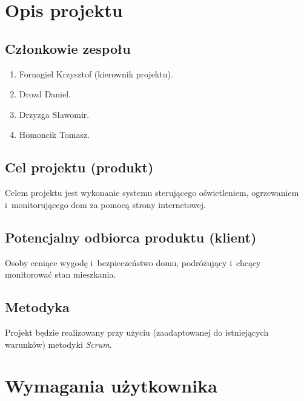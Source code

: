 	\newpage
	
	\section{Opis projektu}
	
	\subsection{Członkowie zespołu}
	
	\begin{enumerate}
		\item Fornagiel Krzysztof (kierownik projektu).
		\item Drozd Daniel.
		\item Drzyzga Sławomir.
		\item Homoncik Tomasz.
	\end{enumerate}
	
	\subsection{Cel projektu (produkt)}
	Celem projektu jest wykonanie systemu sterującego oświetleniem, ogrzewaniem i~monitorującego dom za pomocą strony internetowej.
	
	\subsection{Potencjalny odbiorca produktu (klient)}
	Osoby ceniące wygodę i~bezpieczeństwo domu, podróżujący i~chcący monitorować stan mieszkania.
	
	
	\subsection{Metodyka}
	
	Projekt będzie realizowany przy użyciu (zaadaptowanej do istniejących warunków) metodyki {\em Scrum}. 
	
	\section{Wymagania użytkownika}
	
